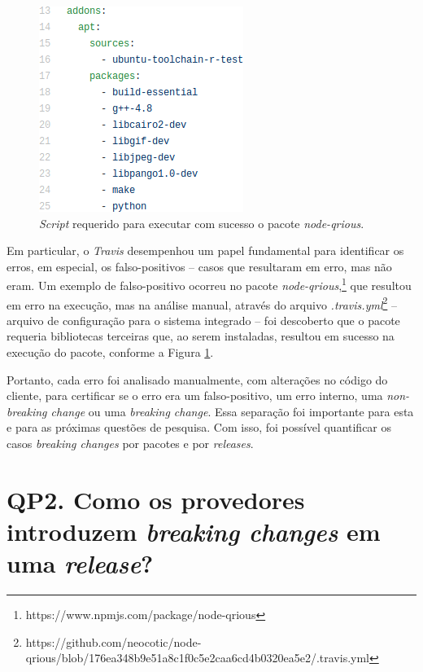 \begin{itemize}
    \begin{figure}
        \centering
        \includegraphics[scale=0.6]{figuras/false_positive.png}
        \caption{\textit{Script} requerido para executar com sucesso o pacote \textit{node-qrious}.}
        \label{fig:false-positive}
    \end{figure}{}

    Em particular, o \textit{Travis} desempenhou um papel fundamental para identificar os erros, em especial, os falso-positivos -- casos que resultaram em erro, mas não eram. Um exemplo de falso-positivo ocorreu no pacote \textit{node-qrious},\footnote{https://www.npmjs.com/package/node-qrious} que resultou em erro na execução, mas na análise manual, através do arquivo \textit{.travis.yml}\footnote{https://github.com/neocotic/node-qrious/blob/176ea348b9e51a8c1f0c5e2caa6cd4b0320ea5e2/.travis.yml} -- arquivo de configuração para o sistema integrado -- foi descoberto que o pacote requeria bibliotecas terceiras que, ao serem instaladas, resultou em sucesso na execução do pacote, conforme a Figura \ref{fig:false-positive}.
\end{itemize}{}

Portanto, cada erro foi analisado manualmente, com alterações no código do cliente, para certificar se o erro era um falso-positivo, um erro interno, uma \textit{non-breaking change} ou uma \textit{breaking change}. Essa separação foi importante para esta e para as próximas questões de pesquisa. Com isso, foi possível quantificar os casos \textit{breaking changes} por pacotes e por \textit{releases}.

\section{QP2. Como os provedores introduzem \textit{breaking changes} em uma \textit{release}?}
\label{sec:qp2}

